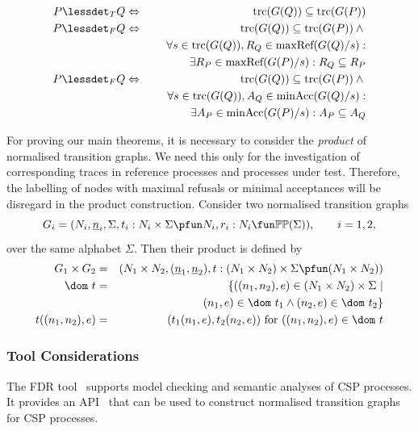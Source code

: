 \begin{lemma}
\label{lemma:tgtrcref}
\begin{eqnarray}
P \lessdet_T Q & \Leftrightarrow & \trc(G(Q)) \subseteq\trc(G(P))
\label{eq:trcrefa}
\\
\label{eq:failrefa}
P \lessdet_F Q & \Leftrightarrow & \trc(G(Q)) \subseteq\trc(G(P)) \wedge {} \nonumber
\\ & & \forall s\in\trc(G(Q)), R_Q\in\maxrefs(G(Q)/s):  \nonumber
\\ & & \tabd
\exists R_P\in\maxrefs(G(P)/s): R_Q\subseteq R_P
\\
\label{eq:failrefb}
P \lessdet_F Q & \Leftrightarrow & \trc(G(Q)) \subseteq\trc(G(P)) \wedge {} \nonumber
\\ & & \forall s\in\trc(G(Q)), A_Q\in\minaccs(G(Q)/s): \nonumber
\\ & & \tabd
\exists A_P\in\minaccs(G(P)/s): A_P\subseteq A_Q
\end{eqnarray}
\end{lemma}

For proving our main theorems, it is necessary to consider the \emph{product} of 
normalised transition graphs. We need this only for the investigation of corresponding traces in reference processes and processes under test. Therefore, the 
labelling of nodes with maximal refusals or minimal acceptances   will be disregard in the 
product construction.
Consider two normalised transition graphs 
\[
G_i = ( N_i, \ii n_i, \Sigma, t_i : N_i\times\Sigma \pfun N_i, r_i : N_i \fun \mathbb{P}\mathbb{P}(\Sigma)),\qquad i = 1,2,
\]
over the same alphabet $\Sigma$. Then their product is defined by
\begin{eqnarray}
G_1\times G_2 & = & (N_1\times N_2,(\ii n_1,\ii n_2), t:(N_1\times N_2)\times\Sigma\pfun (N_1\times N_2))
\\
\dom~t & = & \{ ((n_1,n_2),e)\in (N_1\times N_2)\times\Sigma~|   \nonumber
\\ & & \tabc
(n_1,e)\in\dom~t_1\wedge 
(n_2,e) \in\dom~t_2    \}
\\
t((n_1,n_2),e) & = & (t_1(n_1,e),t_2(n_2,e))\ \text{for $((n_1,n_2),e)\in\dom~t$}
\end{eqnarray}



\subsubsection*{Tool Considerations}
The FDR tool~\cite{fdr} supports model checking and semantic analyses of CSP
processes. It provides an API~\cite{fdrmanual} that can be used to construct
normalised transition graphs for CSP processes.

